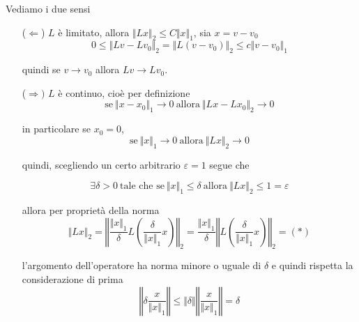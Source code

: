 \begin{dimostrazione}
    Vediamo i due sensi
    \begin{itemize}
        \item[($\Leftarrow $)] $L$ è limitato, allora $\Vert Lx\Vert _{2} \leq C\Vert x\Vert _{1}$, sia $x=v-v_{0}$
              \begin{equation*}
                  0\leq \Vert Lv-Lv_{0}\Vert _{2} =\Vert L(v-v_{0})\Vert _{2} \leq c\Vert v-v_{0}\Vert _{1}
              \end{equation*}

              quindi se $v\rightarrow v_{0}$ allora $Lv\rightarrow Lv_{0}$.

        \item[($\Rightarrow)$] $L$ è continuo, cioè per definizione
              \begin{equation*}
                  \text{se} \ \Vert x-x_{0}\Vert _{1}\rightarrow 0\ \text{allora} \ \Vert Lx-Lx_{0}\Vert _{2}\rightarrow 0
              \end{equation*}

              in particolare se $x_{0} =0$,
              \begin{equation*}
                  \text{se} \ \Vert x\Vert _{1}\rightarrow 0\ \text{allora} \ \Vert Lx\Vert _{2}\rightarrow 0
              \end{equation*}

              quindi, scegliendo un certo arbitrario $\varepsilon =1$ segue che

              \begin{equation*}
                  \exists \delta  >0\ \text{tale che se} \ \Vert x\Vert _{1} \leq \delta \ \text{allora} \ \Vert Lx\Vert _{2} \leq 1=\varepsilon
              \end{equation*}

              allora per proprietà della norma
              \begin{equation*}
                  \Vert Lx\Vert _{2} =\left\Vert \frac{\Vert x\Vert _{1}}{\delta } L\left(\frac{\delta }{\Vert x\Vert _{1}} x\right)\right\Vert _{2} =\frac{\Vert x\Vert _{1}}{\delta }\left\Vert L\left(\frac{\delta }{\Vert x\Vert _{1}} x\right)\right\Vert _{2} =(*)
              \end{equation*}

              l'argomento dell'operatore ha norma minore o uguale di $\delta $ e quindi rispetta la considerazione di prima
              \begin{equation*}
                  \left\Vert \delta \frac{x}{\Vert x\Vert _{1}}\right\Vert \leq \Vert \delta \Vert \left\Vert \frac{x}{\Vert x\Vert _{1}}\right\Vert =\delta
              \end{equation*}


\end{itemize}
\end{dimostrazione}
